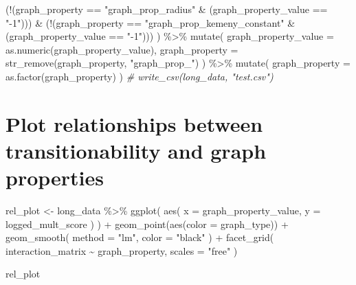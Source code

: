 \documentclass[
]{book}
\newenvironment{Shaded}{\begin{snugshade}}{\end{snugshade}}
\newcommand{\AttributeTok}[1]{\textcolor[rgb]{0.77,0.63,0.00}{#1}}
\newcommand{\CommentTok}[1]{\textcolor[rgb]{0.56,0.35,0.01}{\textit{#1}}}
\newcommand{\FunctionTok}[1]{\textcolor[rgb]{0.00,0.00,0.00}{#1}}
\newcommand{\NormalTok}[1]{#1}
\newcommand{\OtherTok}[1]{\textcolor[rgb]{0.56,0.35,0.01}{#1}}
\newcommand{\SpecialCharTok}[1]{\textcolor[rgb]{0.00,0.00,0.00}{#1}}
\newcommand{\StringTok}[1]{\textcolor[rgb]{0.31,0.60,0.02}{#1}}
\begin{document}
\begin{Shaded}
\begin{Highlighting}[]
\NormalTok{    (}\SpecialCharTok{!}\NormalTok{(graph\_property }\SpecialCharTok{==} \StringTok{"graph\_prop\_radius"} \SpecialCharTok{\&}\NormalTok{ (graph\_property\_value }\SpecialCharTok{==} \StringTok{"{-}1"}\NormalTok{))) }\SpecialCharTok{\&}
\NormalTok{    (}\SpecialCharTok{!}\NormalTok{(graph\_property }\SpecialCharTok{==} \StringTok{"graph\_prop\_kemeny\_constant"} \SpecialCharTok{\&}\NormalTok{ (graph\_property\_value }\SpecialCharTok{==} \StringTok{"{-}1"}\NormalTok{)))}
\NormalTok{  ) }\SpecialCharTok{\%\textgreater{}\%}
  \FunctionTok{mutate}\NormalTok{(}
    \AttributeTok{graph\_property\_value =} \FunctionTok{as.numeric}\NormalTok{(graph\_property\_value),}
    \AttributeTok{graph\_property =} \FunctionTok{str\_remove}\NormalTok{(graph\_property, }\StringTok{"graph\_prop\_"}\NormalTok{)}
\NormalTok{  ) }\SpecialCharTok{\%\textgreater{}\%}
  \FunctionTok{mutate}\NormalTok{(}
    \AttributeTok{graph\_property =} \FunctionTok{as.factor}\NormalTok{(graph\_property)}
\NormalTok{  )}
\CommentTok{\# write\_csv(long\_data, "test.csv")}
\end{Highlighting}
\end{Shaded}

\hypertarget{plot-relationships-between-transitionability-and-graph-properties}{%
\section{Plot relationships between transitionability and graph properties}\label{plot-relationships-between-transitionability-and-graph-properties}}

\begin{Shaded}
\begin{Highlighting}[]
\NormalTok{rel\_plot }\OtherTok{\textless{}{-}}\NormalTok{ long\_data }\SpecialCharTok{\%\textgreater{}\%}
  \FunctionTok{ggplot}\NormalTok{(}
    \FunctionTok{aes}\NormalTok{(}
      \AttributeTok{x =}\NormalTok{ graph\_property\_value,}
      \AttributeTok{y =}\NormalTok{ logged\_mult\_score}
\NormalTok{    )}
\NormalTok{  ) }\SpecialCharTok{+}
  \FunctionTok{geom\_point}\NormalTok{(}\FunctionTok{aes}\NormalTok{(}\AttributeTok{color =}\NormalTok{ graph\_type)) }\SpecialCharTok{+}
  \FunctionTok{geom\_smooth}\NormalTok{(}
    \AttributeTok{method =} \StringTok{"lm"}\NormalTok{,}
    \AttributeTok{color =} \StringTok{"black"}
\NormalTok{  ) }\SpecialCharTok{+}
  \FunctionTok{facet\_grid}\NormalTok{(}
\NormalTok{    interaction\_matrix }\SpecialCharTok{\textasciitilde{}}\NormalTok{ graph\_property,}
    \AttributeTok{scales =} \StringTok{"free"}
\NormalTok{  )}

\NormalTok{rel\_plot}
\end{Highlighting}
\end{Shaded}
\end{document}
